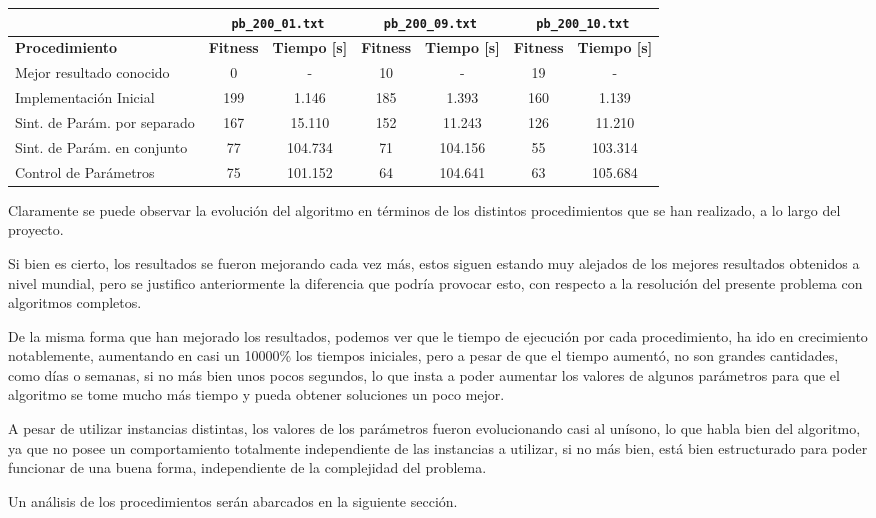 \begin{center}

\footnotesize{
\begin{tabular}{|l|c|c|c|c|c|c|}
\hline
						    & \multicolumn{2}{|c|}{\texttt{pb\_200\_01.txt}} & \multicolumn{2}{|c|}{\texttt{pb\_200\_09.txt}} & \multicolumn{2}{|c|}{\texttt{pb\_200\_10.txt}} \\ \hline
\textbf{Procedimiento} 		& \textbf{Fitness} & \textbf{Tiempo [s]} & \textbf{Fitness} & \textbf{Tiempo [s]} & \textbf{Fitness} & \textbf{Tiempo [s]} \\\hline 
Mejor resultado conocido    & 0				   & -					 &  10				& 		-			  &		19			 & 		-			   \\\hline
Implementación Inicial      & 199			   & 1.146				 &  185				& 		1.393		  &		160			 & 	1.139			   \\\hline
Sint. de Parám. por separado &  167& 15.110				 &  152				& 		11.243		  &		126			 & 	11.210			   \\\hline
Sint. de Parám. en conjunto &  	77 & 104.734			 &  71				& 		104.156		  &		55			 & 	103.314			   \\\hline
Control de Parámetros       & 75			   & 101.152			 &  64				& 		104.641		  &		63			 & 	105.684			   \\\hline
\end{tabular}
}
\end{center}

Claramente se puede observar la evolución del algoritmo en términos de los distintos procedimientos que se han realizado,
a lo largo del proyecto.

Si bien es cierto, los resultados se fueron mejorando cada vez más, estos siguen estando muy alejados
de los mejores resultados obtenidos a nivel mundial, pero se justifico anteriormente la diferencia
que podría provocar esto, con respecto a la resolución del presente problema con algoritmos completos.

De la misma forma que han mejorado los resultados, podemos ver que le tiempo de ejecución por cada procedimiento,
ha ido en crecimiento notablemente, aumentando en casi un 10000\% los tiempos iniciales,
pero a pesar de que el tiempo aumentó, no son grandes cantidades, como días o semanas, si no más bien unos pocos
segundos, lo que insta a poder aumentar los valores de algunos parámetros para que el algoritmo se tome
mucho más tiempo y pueda obtener soluciones un poco mejor.

A pesar de utilizar instancias distintas, los valores de los parámetros fueron evolucionando casi al unísono,
lo que habla bien del algoritmo, ya que no posee un comportamiento totalmente independiente de las
instancias a utilizar, si no más bien, está bien estructurado para poder funcionar de una buena forma,
independiente de la complejidad del problema.

Un análisis de los procedimientos serán abarcados en la siguiente sección.
